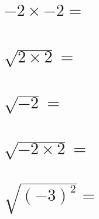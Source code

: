 \documentclass[template=tabling,81pt,headonall]{azmoon}
\begin{document}
\begin{questions}
{\begin{parts}[3]
\part{$-2 \times -2 = $}
\part{$\sqrt{2 \times 2} = $}
\part{$\sqrt{-2} =$}
\part{$\sqrt{-2 \times 2} =$}
\part{$\sqrt{(-3)^2} =$}
\end{parts}
‌
\\
    }\end{questions}
    
\end{document}
